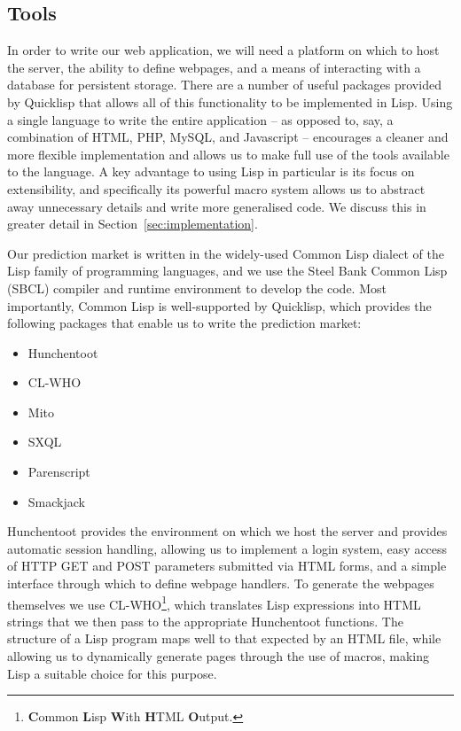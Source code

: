 \subsection{Tools}

In order to write our web application, we will need a platform on which to host
the server, the ability to define webpages, and a means of interacting with a
database for persistent storage. There are a number of useful packages provided
by Quicklisp that allows all of this functionality to be implemented in Lisp.
Using a single language to write the entire application -- as opposed to, say,
a combination of HTML, PHP, MySQL, and Javascript -- encourages a cleaner and
more flexible implementation and allows us to make full use of the tools
available to the language. A key advantage to using Lisp in particular is its
focus on extensibility, and specifically its powerful macro system allows us to
abstract away unnecessary details and write more generalised code. We discuss
this in greater detail in Section~\ref{sec:implementation}.

Our prediction market is written in the widely-used Common Lisp dialect of the
Lisp family of programming languages, and we use the Steel Bank Common Lisp
(SBCL) compiler and runtime environment to develop the code. Most importantly,
Common Lisp is well-supported by Quicklisp, which provides the following
packages that enable us to write the prediction market:

\begin{itemize}
	\item Hunchentoot \cite{Hunchentoot}
	\item CL-WHO \cite{CL-WHO}
	\item Mito \cite{Mito}
	\item SXQL \cite{SXQL}
	\item Parenscript \cite{Parenscript}
	\item Smackjack \cite{Smackjack}
\end{itemize}

Hunchentoot provides the environment on which we host the server and provides
automatic session handling, allowing us to implement a login system, easy
access of HTTP GET and POST parameters submitted via HTML forms, and a simple
interface through which to define webpage handlers. To generate the webpages
themselves we use CL-WHO\footnote{\textbf{C}ommon \textbf{L}isp \textbf{W}ith
\textbf{H}TML \textbf{O}utput.}, which translates Lisp expressions into HTML
strings that we then pass to the appropriate Hunchentoot functions. The
structure of a Lisp program maps well to that expected by an HTML file, while
allowing us to dynamically generate pages through the use of macros, making
Lisp a suitable choice for this purpose.

